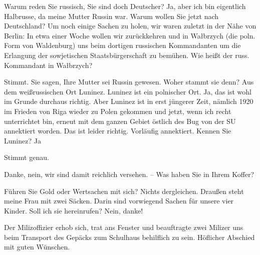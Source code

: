 \begin{dialogue}
	 Warum reden Sie russisch, Sie sind doch Deutscher?
	 Ja, aber ich bin eigentlich Halbrusse, da meine Mutter Russin war.
	 Warum wollen Sie jetzt nach Deutschland?
	 Um noch einige Sachen zu holen, wir waren zuletzt in der Nähe von Berlin: In etwa einer Woche wollen wir zurückkehren und in Wałbrzych (die poln. Form von Waldenburg) uns beim dortigen russischen Kommandanten um die Erlangung der sowjetischen Staatsbürgerschaft zu bemühen.
	 Wie heißt der russ. Kommandant in Wałbrzych?
	
	
	 Stimmt. Sie sagen, Ihre Mutter sei Russin gewesen. Woher stammt sie denn?
	 Aus dem weißrussischen Ort Luninez.
	 Luninez ist ein polnischer Ort.
	 Ja, das ist wohl im Grunde durchaus richtig. Aber Luninez ist in erst jüngerer Zeit, nämlich 1920 im Frieden von Riga wieder zu Polen gekommen und jetzt, wenn ich recht unterrichtet bin, erneut mit dem ganzen Gebiet östlich des Bug von der SU annektiert worden.
	 Das ist leider richtig. Vorläufig annektiert. Kennen Sie Luninez?
	 Ja
	
	
	 Stimmt genau.
	
	
	 Danke, nein, wir sind damit reichlich versehen. -- Was haben Sie in Ihrem Koffer?

	
	 Führen Sie Gold oder Wertsachen mit sich?
	 Nichts dergleichen. Draußen steht meine Frau mit zwei Säcken. Darin sind vorwiegend Sachen für unsere vier Kinder. Soll ich sie hereinrufen?
	 Nein, danke!
\end{dialogue}

Der Milizoffizier erhob sich, trat ans Fenster und beauftragte zwei Milizer uns beim Transport des Gepäcks zum Schulhaus behilflich zu sein. Höflicher Abschied mit  guten Wünschen.

